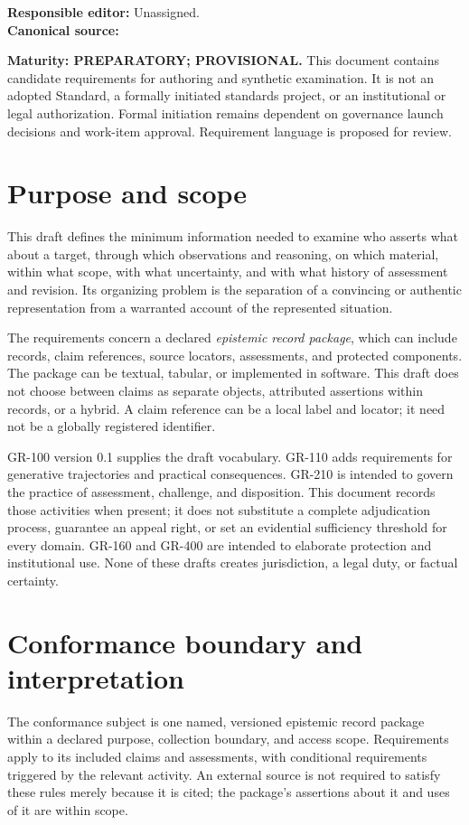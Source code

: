 \documentclass[11pt,a4paper]{article}
\begin{document}

\noindent\textbf{Responsible editor:} Unassigned.\\
\textbf{Canonical source:} 

\noindent\textbf{Maturity: PREPARATORY; PROVISIONAL.} This document contains candidate requirements for authoring and synthetic examination. It is not an adopted Standard, a formally initiated standards project, or an institutional or legal authorization. Formal initiation remains dependent on governance launch decisions and work-item approval. Requirement language is proposed for review.

\tableofcontents\clearpage

\section{Purpose and scope}
This draft defines the minimum information needed to examine who asserts what about a target, through which observations and reasoning, on which material, within what scope, with what uncertainty, and with what history of assessment and revision. Its organizing problem is the separation of a convincing or authentic representation from a warranted account of the represented situation.

The requirements concern a declared \emph{epistemic record package}, which can include records, claim references, source locators, assessments, and protected components. The package can be textual, tabular, or implemented in software. This draft does not choose between claims as separate objects, attributed assertions within records, or a hybrid. A claim reference can be a local label and locator; it need not be a globally registered identifier.

GR-100 version 0.1 supplies the draft vocabulary. GR-110 adds requirements for generative trajectories and practical consequences. GR-210 is intended to govern the practice of assessment, challenge, and disposition. This document records those activities when present; it does not substitute a complete adjudication process, guarantee an appeal right, or set an evidential sufficiency threshold for every domain. GR-160 and GR-400 are intended to elaborate protection and institutional use. None of these drafts creates jurisdiction, a legal duty, or factual certainty.

\section{Conformance boundary and interpretation}
The conformance subject is one named, versioned epistemic record package within a declared purpose, collection boundary, and access scope. Requirements apply to its included claims and assessments, with conditional requirements triggered by the relevant activity. An external source is not required to satisfy these rules merely because it is cited; the package's assertions about it and uses of it are within scope.
\end{document}
